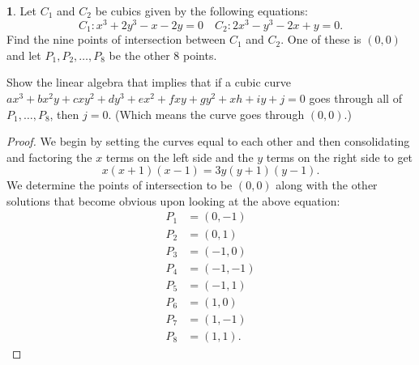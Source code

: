 \documentclass[12pt]{article}
\theoremstyle{definition}
\newtheorem{ex}{}
\begin{document}
\begin{ex}
	Let $C_1$ and $C_2$ be cubics given by the following equations: \begin{equation*}
		C_1: x^3 + 2y^3 - x - 2y = 0 \quad C_2 : 2x^3 - y^3 - 2x + y = 0.
	\end{equation*}
	Find the nine points of intersection between $C_1$ and $C_2$.
	One of these is $(0, 0)$ and let $P_1, P_2, \dots, P_8$ be the other 8 points.

	Show the linear algebra that implies that if a cubic curve $ax^3 + bx^2y + cxy^2 + dy^3 + ex^2 + fxy + gy^2 + xh + iy + j = 0$ goes through all of $P_1, \dots, P_8$, then $j = 0$.
	(Which means the curve goes through $(0, 0)$.)
\end{ex}
\begin{proof}
	We begin by setting the curves equal to each other and then consolidating and factoring the $x$ terms on the left side and the $y$ terms on the right side to get \begin{equation*}
		x(x+1)(x-1) = 3y(y+1)(y-1).
	\end{equation*}
	We determine the points of intersection to be $(0, 0)$ along with the other solutions that become obvious upon looking at the above equation: \begin{align*}
		P_1 & = (0, -1)  \\
		P_2 & = (0, 1)   \\
		P_3 & = (-1, 0)  \\
		P_4 & = (-1, -1) \\
		P_5 & = (-1, 1)  \\
		P_6 & = (1, 0)   \\
		P_7 & = (1, -1)  \\
		P_8 & = (1, 1).
	\end{align*}


\end{proof}
\end{document}
